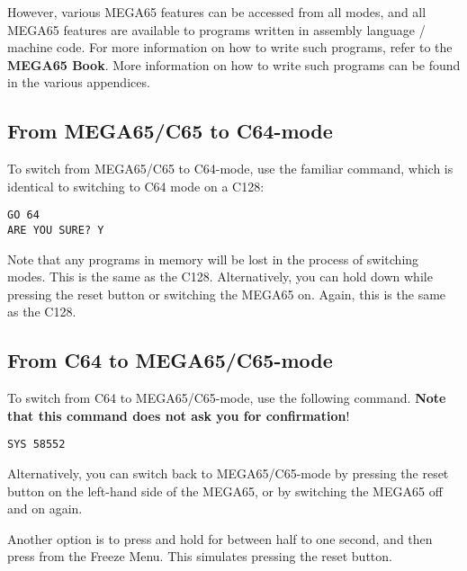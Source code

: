 However, various MEGA65 features can be accessed from all modes, and all MEGA65 features are available
to programs written in assembly language / machine code.
\ifdefined\printmanual
For more information on how to write such programs, refer to the {\bf MEGA65 Book}.
\else
More information on how to write such programs can be found in the various appendices.
\fi

\subsection{From MEGA65/C65 to C64-mode}

To switch from MEGA65/C65 to C64-mode, use the familiar  command, which is identical to switching to C64
mode on a C128:
\begin{tcolorbox}[colback=black,coltext=white]
\verbatimfont{\codefont}
\begin{verbatim}
GO 64
ARE YOU SURE? Y
\end{verbatim}
\end{tcolorbox}

Note that any programs in memory will be lost in the process of switching modes. This is the same as the C128.
Alternatively, you can hold \megasymbolkey down while pressing the reset button or switching the MEGA65 on. Again,
this is the same as the C128.

\subsection{From C64 to MEGA65/C65-mode}

To switch from C64 to MEGA65/C65-mode, use the following command. {\bf Note that this command does not ask you for
confirmation}!

\begin{tcolorbox}[colback=black,coltext=white]
\verbatimfont{\codefont}
\begin{verbatim}
SYS 58552
\end{verbatim}
\end{tcolorbox}

Alternatively, you can switch back to MEGA65/C65-mode by pressing the reset
button on the left-hand side of the MEGA65, or by switching the
MEGA65 off and on again.

Another option is to press and hold  for between half to one second, and then press 
from the Freeze Menu.  This simulates pressing the reset button.

